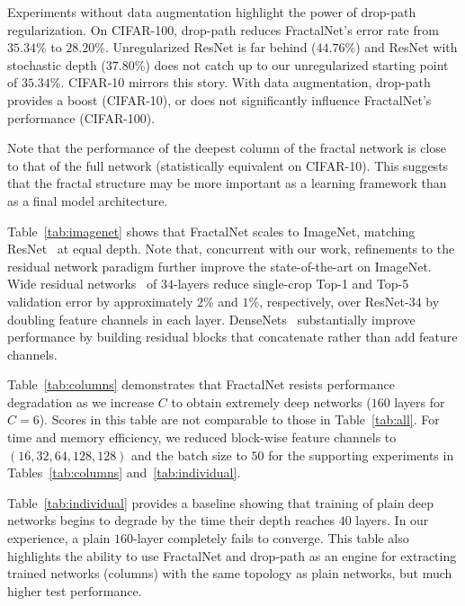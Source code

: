 \documentclass{article}
\newcommand{\fracnet}{FractalNet}
\newcommand{\resnet}{ResNet}
\newcommand{\droppath}{drop-path}
\begin{document}
Experiments without data augmentation highlight the power of {\droppath}
regularization.  On CIFAR-100, {\droppath} reduces {\fracnet}'s error rate
from $35.34\%$ to $28.20\%$.  Unregularized {\resnet} is far behind ($44.76\%$)
and {\resnet} with stochastic depth ($37.80\%$) does not catch up to our
unregularized starting point of $35.34\%$.  CIFAR-10 mirrors this story.  With
data augmentation, {\droppath} provides a boost (CIFAR-10), or does not
significantly influence {\fracnet}'s performance (CIFAR-100).

Note that the performance of the deepest column of the fractal network is
close to that of the full network (statistically equivalent on CIFAR-10).
This suggests that the fractal structure may be more important as a
learning framework than as a final model architecture.

Table~\ref{tab:imagenet} shows that {\fracnet} scales to ImageNet,
matching {\resnet}~\citep{he2015deep} at equal depth.  Note that, concurrent
with our work, refinements to the residual network paradigm further improve
the state-of-the-art on ImageNet.  Wide residual networks~\citep{wideresnet}
of $34$-layers reduce single-crop Top-1 and Top-5 validation error by
approximately $2\%$ and $1\%$, respectively, over ResNet-$34$ by doubling
feature channels in each layer.  DenseNets~\citep{densenet} substantially
improve performance by building residual blocks that concatenate rather than
add feature channels.

Table~\ref{tab:columns} demonstrates that {\fracnet} resists performance
degradation as we increase $C$ to obtain extremely deep networks ($160$ layers
for $C=6$).  Scores in this table are not comparable to those in
Table~\ref{tab:all}.  For time and memory efficiency, we reduced block-wise
feature channels to $(16, 32, 64, 128, 128)$ and the batch size to $50$ for the
supporting experiments in Tables~\ref{tab:columns} and~\ref{tab:individual}.

Table~\ref{tab:individual} provides a baseline showing that training of plain
deep networks begins to degrade by the time their depth reaches $40$ layers.
In our experience, a plain $160$-layer completely fails to converge. This
table also highlights the ability to use {\fracnet} and {\droppath} as an
engine for extracting trained networks (columns) with the same topology as
plain networks, but much higher test performance.
\end{document}
